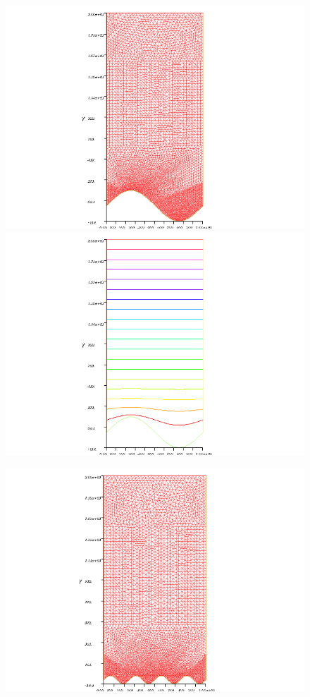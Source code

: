 \documentclass[12pt, a4paper, twoside, openright]{book}
\begin{document}
\begin{figure}[ht]
\begin{center}
\includegraphics[scale=0.5, trim=4cm 0cm 4cm 0cm, clip=true]{FEM_mesh_1.png}
\includegraphics[scale=0.5, trim=4cm 0cm 4cm 0cm, clip=true]{FEM_streamlines_1.png}
\end{center}
\vspace{1em}
\begin{center}
\includegraphics[scale=0.5, trim=4cm 0cm 4cm 0cm, clip=true]{FEM_mesh_4.png}

\end{center}
\end{figure}
\end{document}

